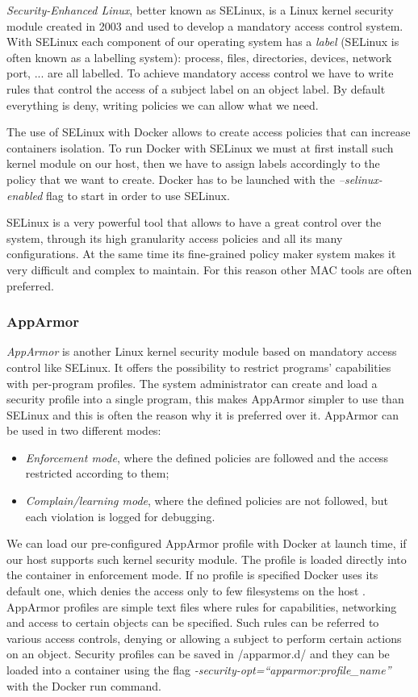 \documentclass[a4paper,12pt]{article}
\begin{document}
\textit{Security-Enhanced Linux}, better known as SELinux, is a Linux kernel
security module created in 2003 and used to develop a mandatory access control
system. With SELinux each component of our operating system has a \textit{label}
(SELinux is often known as a labelling system): process, files, directories,
devices, network port, ... are all labelled. To achieve mandatory access control
we have to write rules that control the access of a subject label on an object
label. By default everything is deny, writing policies we can allow what we
need. \par The use of SELinux with Docker allows to create access policies that
can increase containers isolation. To run Docker with SELinux we must at first
install such kernel module on our host, then we have to assign labels
accordingly to the policy that we want to create. Docker has to be launched
with the \textit{--selinux-enabled} flag to start in order to use SELinux. \par
SELinux is a very powerful tool that allows to have a great control over the
system, through its high granularity access policies and all its many
configurations. At the same time its fine-grained policy maker system makes it
very difficult and complex to maintain. For this reason other MAC tools are
often preferred.

\subsubsection{AppArmor}

\textit{AppArmor} is another Linux kernel security module based on mandatory
access control like SELinux. It offers the possibility to restrict programs'
capabilities with per-program profiles. The system administrator can create and
load a security profile into a single program, this makes AppArmor simpler to
use than SELinux and this is often the reason why it is preferred over it.
AppArmor can be used in two different modes:
\begin{itemize}
  \item \textit{Enforcement mode}, where the defined policies are followed and
  the access restricted according to them; 
  \item \textit{Complain/learning mode}, where the defined policies are not
  followed, but each violation is logged for debugging.
\end{itemize}
We can load our pre-configured AppArmor profile with Docker at launch time, if
our host supports such kernel security module. The profile is loaded directly
into the container in enforcement mode. If no profile is specified Docker uses
its default one, which denies the access only to few filesystems on the host
\cite{bui_docker_security}. AppArmor profiles are simple text files where rules
for capabilities, networking and access to certain objects can be specified.
Such rules can be referred to various access controls, denying or allowing a
subject to perform certain actions on an object.   Security profiles can be
saved in /apparmor.d/ and they can be loaded into a container using the flag
\textit{-security-opt=``apparmor:profile\_name''} with the Docker run command. 
\end{document}
